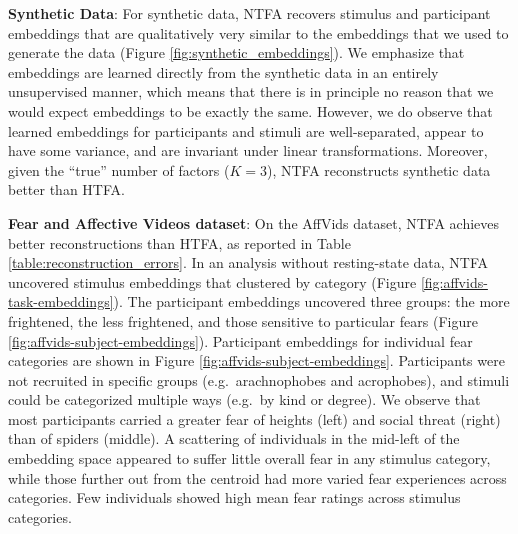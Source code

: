 \documentclass[twoside]{article}
\begin{document}
\textbf{Synthetic Data}: For synthetic data, NTFA recovers stimulus and participant embeddings that are qualitatively very similar to the embeddings that we used to generate the data (Figure \ref{fig:synthetic_embeddings}). We emphasize that embeddings are learned directly from the synthetic data in an entirely unsupervised manner, which means that there is in principle no reason that we would expect embeddings to be exactly the same. However, we do observe that learned embeddings for participants and stimuli are well-separated, appear to have some variance, and are invariant under linear transformations. Moreover, given the ``true'' number of factors ($K=3$), NTFA reconstructs synthetic data better than HTFA.

\textbf{Fear and Affective Videos dataset}: On the AffVids dataset, NTFA achieves better reconstructions than HTFA, as reported in Table \ref{table:reconstruction_errors}.  In an analysis without resting-state data, NTFA uncovered stimulus embeddings that clustered by category (Figure \ref{fig:affvids-task-embeddings}).  The participant embeddings uncovered three groups: the more frightened, the less frightened, and those sensitive to particular fears (Figure \ref{fig:affvids-subject-embeddings}). Participant embeddings for individual fear categories are shown in Figure \ref{fig:affvids-subject-embeddings}. Participants were not recruited in specific groups (e.g.~arachnophobes and acrophobes), and stimuli could be categorized multiple ways (e.g.~by kind or degree).  We observe that most participants carried a greater fear of heights (left) and social threat (right) than of spiders (middle).  A scattering of individuals in the mid-left of the embedding space appeared to suffer little overall fear in any stimulus category, while those further out from the centroid had more varied fear experiences across categories.  Few individuals showed high mean fear ratings across stimulus categories.
\end{document}
